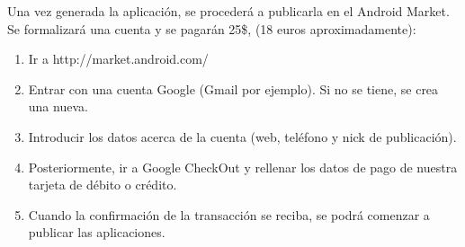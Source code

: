 \documentclass[12 pt, a4paper, twoside]{article}
\begin{document}
Una vez generada la aplicación, se procederá a publicarla en el Android Market.
Se formalizará una cuenta y se pagarán 25\$, (18 euros aproximadamente):
\begin{enumerate}
\item Ir a http://market.android.com/
\item Entrar con una cuenta Google (Gmail por ejemplo). Si no se tiene, se crea
una nueva.
\item Introducir los datos acerca de la cuenta (web, teléfono y nick de publicación).
\item Posteriormente, ir a Google CheckOut y rellenar los datos de pago de nuestra
tarjeta de débito o crédito.
\item Cuando la confirmación de la transacción se reciba, se podrá comenzar a
publicar las aplicaciones.
\end{enumerate}
\end{document}
